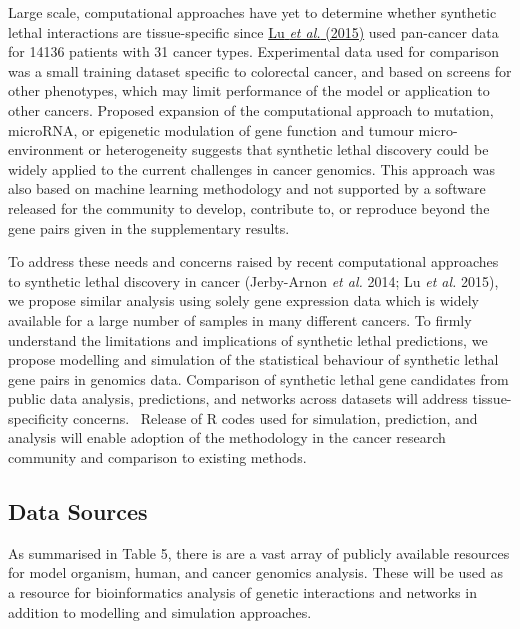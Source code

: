 Large scale, computational approaches have yet to determine whether
synthetic lethal interactions are tissue-specific since
\hyperlink{ENREF74}{Lu}\hyperlink{ENREF74}{\textit{ et
al.}}\hyperlink{ENREF74}{ (2015)} used pan-cancer data for 14136
patients with 31 cancer types. Experimental data used for comparison
was a small training dataset specific to colorectal cancer, and based
on screens for other phenotypes, which may limit performance of the
model or application to other cancers. Proposed expansion of the
computational approach to mutation, microRNA, or epigenetic modulation
of gene function and tumour micro-environment or heterogeneity suggests
that synthetic lethal discovery could be widely applied to the current
challenges in cancer genomics. This approach was also based on
machine learning methodology and not supported by a software released
for the community to develop, contribute to, or reproduce beyond the
gene pairs given in the supplementary results.


To address these needs and concerns raised by recent computational
approaches to synthetic lethal discovery in cancer (Jerby-Arnon\textit{
et al.} 2014; Lu\textit{ et al.} 2015), we propose similar analysis
using solely gene expression data which is widely available for a large
number of samples in many different cancers. To firmly understand the
limitations and implications of synthetic lethal predictions, we
propose modelling and simulation of the statistical behaviour of
synthetic lethal gene pairs in genomics data. Comparison of synthetic
lethal gene candidates from public data analysis, predictions, and
networks across datasets will address tissue-specificity concerns.
\ Release of R codes used for simulation, prediction, and analysis will
enable adoption of the methodology in the cancer research community and
comparison to existing methods.


\clearpage\subsection[Data Sources]{Data Sources}

As summarised in Table 5, there is are a vast array of publicly
available resources for model organism, human, and cancer genomics
analysis. These will be used as a resource for bioinformatics analysis
of genetic interactions and networks in addition to modelling and
simulation approaches. 


